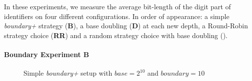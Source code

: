 In these experiments, we measure the average bit-length of the digit part of
identifiers on four different configurations. In order of appearance: a simple
\emph{boundary+} strategy (\textbf{B}), a base doubling (\textbf{D}) at each
new depth, a Round-Robin strategy choice (\textbf{RR}) and a random strategy
choice with base doubling (\textbf{\NAME}).

\paragraph{Boundary Experiment \textbf{B}}

\begin{figure}
\begin{center}
\small

\caption{Simple \emph{boundary+} setup with $base=2^{10}$ and $boundary=10$}
\label{fig:dimlogexperiment}
\end{center}
\end{figure}

